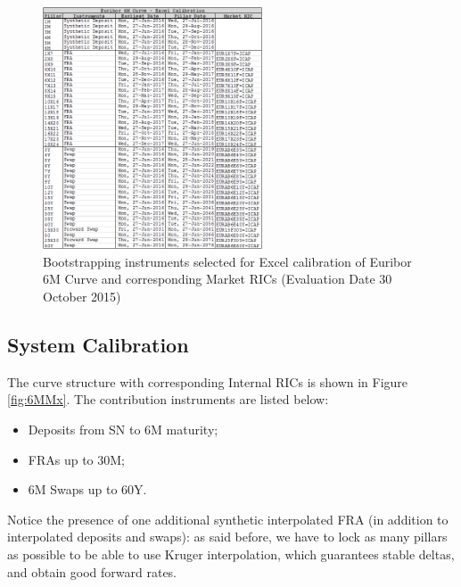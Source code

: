 \begin{figure}
\centering
\includegraphics[width=0.58\textwidth]{images/6MExcel.png}
\caption{Bootstrapping instruments selected for Excel calibration of Euribor 6M Curve and corresponding Market RICs (Evaluation Date 30 October 2015)}
\label{fig:6MExcel}
\end{figure}

\subsection{System Calibration}

The curve structure with corresponding Internal RICs is shown in Figure \ref{fig:6MMx}. The contribution instruments are listed below:
\begin{itemize}
\item Deposits from SN to 6M maturity; 
\item FRAs up to 30M;
\item 6M Swaps up to 60Y.
\end{itemize}
Notice the presence of one additional synthetic interpolated FRA (in addition to interpolated deposits and swaps): as said before, we have to lock as many pillars as possible to be able to use Kruger interpolation, which guarantees stable deltas, and obtain good forward rates.  

